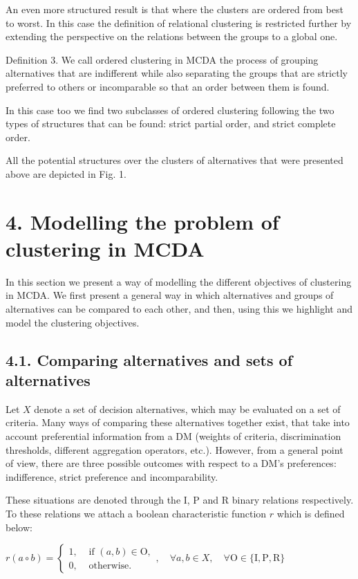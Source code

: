 \documentclass[10pt]{article}
\begin{document}
An even more structured result is that where the clusters are ordered from best to worst. In this case the definition of relational clustering is restricted further by extending the perspective on the relations between the groups to a global one.

Definition 3. We call ordered clustering in MCDA the process of grouping alternatives that are indifferent while also separating the groups that are strictly preferred to others or incomparable so that an order between them is found.

In this case too we find two subclasses of ordered clustering following the two types of structures that can be found: strict partial order, and strict complete order.

All the potential structures over the clusters of alternatives that were presented above are depicted in Fig. 1.

\section*{4. Modelling the problem of clustering in MCDA}
In this section we present a way of modelling the different objectives of clustering in MCDA. We first present a general way in which alternatives and groups of alternatives can be compared to each other, and then, using this we highlight and model the clustering objectives.

\subsection*{4.1. Comparing alternatives and sets of alternatives}
Let $X$ denote a set of decision alternatives, which may be evaluated on a set of criteria. Many ways of comparing these alternatives together exist, that take into account preferential information from a DM (weights of criteria, discrimination thresholds, different aggregation operators, etc.). However, from a general point of view, there are three possible outcomes with respect to a DM's preferences: indifference, strict preference and incomparability.

These situations are denoted through the I, P and R binary relations respectively. To these relations we attach a boolean characteristic function $r$ which is defined below:

$r(a \circ b)=\left\{\begin{array}{ll}1, & \text { if }(a, b) \in \mathrm{O}, \\ 0, & \text { otherwise. }\end{array}, \quad \forall a, b \in X, \quad \forall \mathrm{O} \in\{\mathrm{I}, \mathrm{P}, \mathrm{R}\}\right.$
\end{document}
